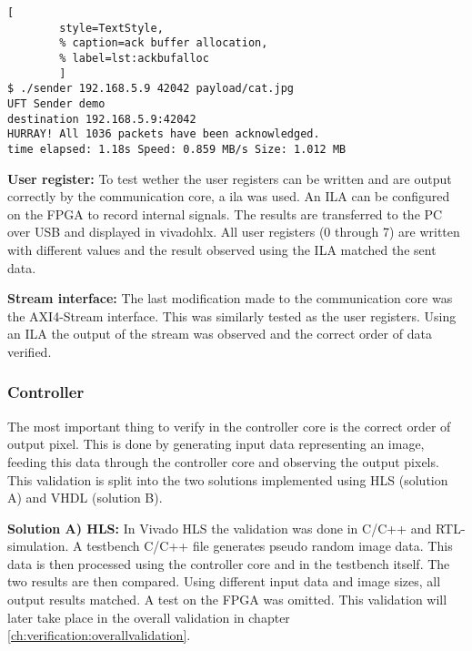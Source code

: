 \begin{minipage}{1\linewidth}
    \begin{lstlisting}[
        style=TextStyle, 
        % caption=ack buffer allocation, 
        % label=lst:ackbufalloc
        ]
$ ./sender 192.168.5.9 42042 payload/cat.jpg
UFT Sender demo
destination 192.168.5.9:42042
HURRAY! All 1036 packets have been acknowledged.
time elapsed: 1.18s Speed: 0.859 MB/s Size: 1.012 MB\end{lstlisting}
\end{minipage}

\vspace{1ex}
\textbf{User register:} To test wether the user registers can be written and are
output correctly by the communication core, a \gls{ila} 
was used. An ILA can be configured on the FPGA to record internal signals. The
results are transferred to the PC over USB and displayed in \gls{vivadohlx}. All
user registers (0 through 7) are written with different values and the result
observed using the ILA matched the sent data.

\vspace{1ex}
\textbf{Stream interface:} The last modification made to the communication core
was the AXI4-Stream interface. This was similarly tested as the user registers.
Using an ILA the output of the stream was observed and the correct order of data
verified. 

\subsubsection*{Controller} 
The most important thing to verify in the controller core is the correct order
of output pixel. This is done by generating input data representing an image,
feeding this data through the controller core and observing the output pixels.
This validation is split into the two solutions implemented using HLS (solution
A) and VHDL (solution B).

\vspace{1ex}
\textbf{Solution A) HLS:} In Vivado HLS the validation was done in C/C++ and
RTL-simulation. A testbench C/C++ file generates pseudo random image data. This
data is then processed using the controller core and in the testbench itself.
The two results are then compared. Using different input data and image sizes,
all output results matched. A test on the FPGA was omitted. This validation will
later take place in the overall validation in chapter \ref{ch:verification:overallvalidation}.

